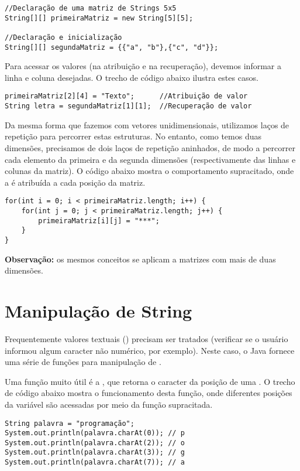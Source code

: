 \begin{verbatim}
//Declaração de uma matriz de Strings 5x5
String[][] primeiraMatriz = new String[5][5];

//Declaração e inicialização
String[][] segundaMatriz = {{"a", "b"},{"c", "d"}};
\end{verbatim}

Para acessar os valores (na atribuição e na recuperação), devemos informar a linha e coluna desejadas. O trecho de código abaixo ilustra estes casos.

\begin{verbatim}
primeiraMatriz[2][4] = "Texto";      //Atribuição de valor
String letra = segundaMatriz[1][1];  //Recuperação de valor
\end{verbatim}

Da mesma forma que fazemos com vetores unidimensionais, utilizamos laços de repetição para percorrer estas estruturas. No entanto, como temos duas dimensões, precisamos de dois laços de repetição aninhados, de modo a percorrer cada elemento da primeira e da segunda dimensões (respectivamente das linhas e colunas da matriz). O código abaixo mostra o comportamento supracitado, onde a  \code{****} é atribuída a cada posição da matriz.

\begin{verbatim}
for(int i = 0; i < primeiraMatriz.length; i++) {
	for(int j = 0; j < primeiraMatriz.length; j++) {
		primeiraMatriz[i][j] = "***";
	}
}
\end{verbatim}

\textbf{Observação:} os mesmos conceitos se aplicam a matrizes com mais de duas dimensões.

\section{Manipulação de String}
Frequentemente valores textuais () precisam ser tratados (verificar se o usuário informou algum caracter não numérico, por exemplo). Neste caso, o Java fornece uma série de funções para manipulação de .

Uma função muito útil é a , que retorna o caracter da posição  de uma . O trecho de código abaixo mostra o funcionamento desta função, onde diferentes posições da variável  são acessadas por meio da função supracitada.

\begin{verbatim}
String palavra = "programação";
System.out.println(palavra.charAt(0)); // p
System.out.println(palavra.charAt(2)); // o
System.out.println(palavra.charAt(3)); // g
System.out.println(palavra.charAt(7)); // a
\end{verbatim}

